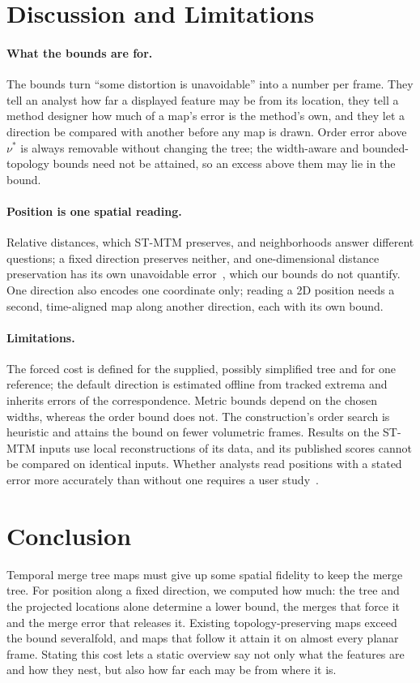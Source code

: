 \documentclass[review]{vgtc}
\begin{document}
\section{Discussion and Limitations}\label{sec:discussion}
\paragraph{What the bounds are for.} The bounds turn ``some distortion is unavoidable'' into a number per frame. They tell an analyst how far a displayed feature may be from its location, they tell a method designer how much of a map's error is the method's own, and they let a direction be compared with another before any map is drawn. Order error above $\nu^*$ is always removable without changing the tree; the width-aware and bounded-topology bounds need not be attained, so an excess above them may lie in the bound.

\paragraph{Position is one spatial reading.} Relative distances, which ST-MTM preserves, and neighborhoods answer different questions; a fixed direction preserves neither, and one-dimensional distance preservation has its own unavoidable error~\cite{STMTM:2026}, which our bounds do not quantify. One direction also encodes one coordinate only; reading a 2D position needs a second, time-aligned map along another direction, each with its own bound.

\paragraph{Limitations.} The forced cost is defined for the supplied, possibly simplified tree and for one reference; the default direction is estimated offline from tracked extrema and inherits errors of the correspondence. Metric bounds depend on the chosen widths, whereas the order bound does not. The construction's order search is heuristic and attains the bound on fewer volumetric frames. Results on the ST-MTM inputs use local reconstructions of its data, and its published scores cannot be compared on identical inputs. Whether analysts read positions with a stated error more accurately than without one requires a user study~\cite{Kamakshidasan:2021:MM,McNutt:2020:SVM}.

\section{Conclusion}
Temporal merge tree maps must give up some spatial fidelity to keep the merge tree. For position along a fixed direction, we computed how much: the tree and the projected locations alone determine a lower bound, the merges that force it and the merge error that releases it. Existing topology-preserving maps exceed the bound severalfold, and maps that follow it attain it on almost every planar frame. Stating this cost lets a static overview say not only what the features are and how they nest, but also how far each may be from where it is.

\FloatBarrier
\begingroup
{}


\endgroup
\end{document}
